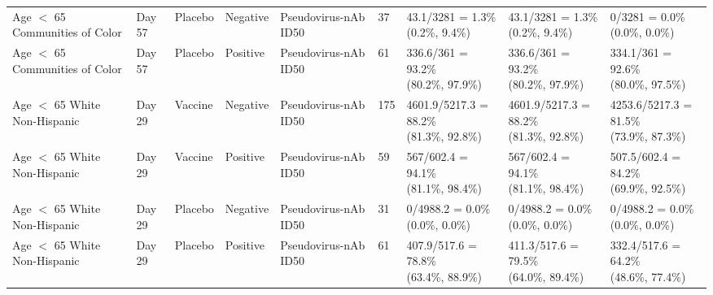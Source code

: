\documentclass[]{book}
\theoremstyle{definition}
\theoremstyle{definition}
\theoremstyle{definition}
\newcommand{\1}{\mathbbm{1}}
\begin{document}
\begin{landscape}
\begin{ThreePartTable}
\begin{longtable}[t]{>{\raggedright\arraybackslash}p{2.7cm}llllllll}
\hspace{1em}Age $<$ 65 Communities of Color & Day 57 & Placebo & Negative & Pseudovirus-nAb ID50 & 37 & \makecell[l]{43.1/3281 = 1.3\%\\(0.2\%, 9.4\%)} & \makecell[l]{43.1/3281 = 1.3\%\\(0.2\%, 9.4\%)} & \makecell[l]{0/3281 = 0.0\%\\(0.0\%, 0.0\%)}\\
\hspace{1em}Age $<$ 65 Communities of Color & Day 57 & Placebo & Positive & Pseudovirus-nAb ID50 & 61 & \makecell[l]{336.6/361 = 93.2\%\\(80.2\%, 97.9\%)} & \makecell[l]{336.6/361 = 93.2\%\\(80.2\%, 97.9\%)} & \makecell[l]{334.1/361 = 92.6\%\\(80.0\%, 97.5\%)}\\
\hspace{1em}Age $<$ 65 White Non-Hispanic & Day 29 & Vaccine & Negative & Pseudovirus-nAb ID50 & 175 & \makecell[l]{4601.9/5217.3 = 88.2\%\\(81.3\%, 92.8\%)} & \makecell[l]{4601.9/5217.3 = 88.2\%\\(81.3\%, 92.8\%)} & \makecell[l]{4253.6/5217.3 = 81.5\%\\(73.9\%, 87.3\%)}\\
\hspace{1em}Age $<$ 65 White Non-Hispanic & Day 29 & Vaccine & Positive & Pseudovirus-nAb ID50 & 59 & \makecell[l]{567/602.4 = 94.1\%\\(81.1\%, 98.4\%)} & \makecell[l]{567/602.4 = 94.1\%\\(81.1\%, 98.4\%)} & \makecell[l]{507.5/602.4 = 84.2\%\\(69.9\%, 92.5\%)}\\
\hspace{1em}Age $<$ 65 White Non-Hispanic & Day 29 & Placebo & Negative & Pseudovirus-nAb ID50 & 31 & \makecell[l]{0/4988.2 = 0.0\%\\(0.0\%, 0.0\%)} & \makecell[l]{0/4988.2 = 0.0\%\\(0.0\%, 0.0\%)} & \makecell[l]{0/4988.2 = 0.0\%\\(0.0\%, 0.0\%)}\\
\hspace{1em}Age $<$ 65 White Non-Hispanic & Day 29 & Placebo & Positive & Pseudovirus-nAb ID50 & 61 & \makecell[l]{407.9/517.6 = 78.8\%\\(63.4\%, 88.9\%)} & \makecell[l]{411.3/517.6 = 79.5\%\\(64.0\%, 89.4\%)} & \makecell[l]{332.4/517.6 = 64.2\%\\(48.6\%, 77.4\%)}\\

\end{longtable}
\end{ThreePartTable}
\end{landscape}
\end{document}
